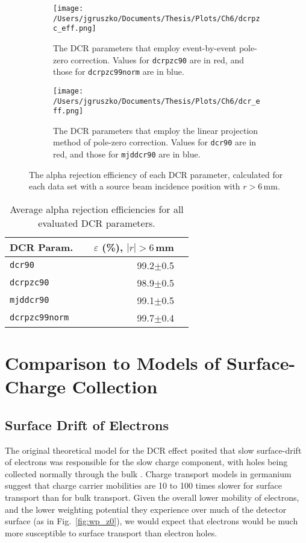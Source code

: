 \begin{figure*}[]
 \centering
 \begin{subfigure}[]{\textwidth}
 \centering
 \texttt{[image: /Users/jgruszko/Documents/Thesis/Plots/Ch6/dcrpzc\_eff.png]}
 \caption{The DCR parameters that employ event-by-event pole-zero correction. Values for {\tt dcrpzc90} are in red, and those for {\tt dcrpzc99norm} are in blue.} 
 \end{subfigure}
 \hfill
  \begin{subfigure}[]{\textwidth}
  \centering
 \texttt{[image: /Users/jgruszko/Documents/Thesis/Plots/Ch6/dcr\_eff.png]}
 \caption{The DCR parameters that employ the linear projection method of pole-zero correction. Values for {\tt dcr90} are in red, and those for {\tt mjddcr90} are in blue.} 
 \end{subfigure}
 \caption[The alpha rejection efficiency as a function of radius for each DCR parameter]{The alpha rejection efficiency of each DCR parameter, calculated for each data set with a source beam incidence position with $r>6$\,mm.}
 \label{fig:eff_allR}
\end{figure*}

\begin{table}[]
\begin{center}
\begin{tabular}{l r r}
DCR Param. & ~~$\varepsilon$ (\%), $|r|>6$\,mm \\  \hline
{\tt dcr90} & 99.2$\pm$0.5  \\
{\tt dcrpzc90} & 98.9$\pm$0.5  \\
{\tt mjddcr90} & 99.1$\pm$0.5  \\
{\tt dcrpzc99norm} &  99.7$\pm$0.4 \\
\end{tabular}
\caption{Average alpha rejection efficiencies for all evaluated DCR parameters.} \label{tab:avgEff}
\end{center}
\end{table}

\section{Comparison to Models of Surface-Charge Collection}\label{sec:dcr_models}
\subsection{Surface Drift of Electrons}
The original theoretical model for the DCR effect posited that slow surface-drift of electrons was responsible for the slow charge component, with holes being collected normally through the bulk \cite{Neutrino16}. Charge transport models in germanium \cite{Mullowney2012} suggest that charge carrier mobilities are 10 to 100 times slower for surface transport than for bulk transport. Given the overall lower mobility of electrons, and the lower weighting potential they experience over much of the detector surface (as in Fig.~\ref{fig:wp_z0}), we would expect that electrons would be much more susceptible to surface transport than electron holes. 


